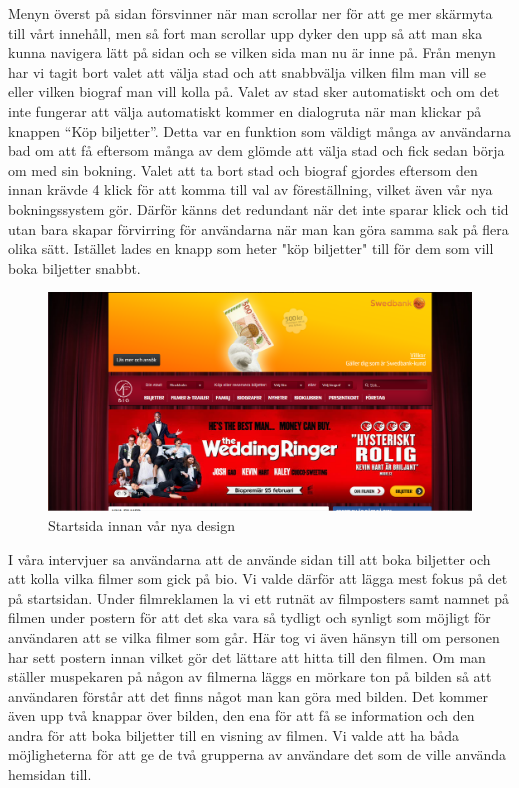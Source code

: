 \documentclass[swedish,a4paper,11pt]{article}
\begin{document}

Menyn överst på sidan försvinner när man scrollar ner för att ge mer skärmyta till vårt innehåll, men så fort man scrollar upp dyker den upp så att man ska kunna navigera lätt på sidan och se vilken sida man nu är inne på. Från menyn har vi tagit bort valet att välja stad och att snabbvälja vilken film man vill se eller vilken biograf man vill kolla på. Valet av stad sker automatiskt och om det inte fungerar att välja automatiskt kommer en dialogruta när man klickar på knappen “Köp biljetter”. Detta var en funktion som väldigt många av användarna bad om att få eftersom många av dem glömde att välja stad och fick sedan börja om med sin bokning. Valet att ta bort stad och biograf gjordes eftersom den innan krävde 4 klick för att komma till val av föreställning, vilket även vår nya bokningssystem gör. Därför känns det redundant när det inte sparar klick och tid utan bara skapar förvirring för användarna när man kan göra samma sak på flera olika sätt. Istället lades en knapp som heter "köp biljetter" till för dem som vill boka biljetter snabbt. 
\noindent

\begin{figure}[H]
\centering
\includegraphics[scale=0.27]{befintligstartsida.png} 
\caption{Startsida innan vår nya design}
\end{figure}





I våra intervjuer sa användarna att de använde sidan till att boka biljetter och att kolla vilka filmer som gick på bio. Vi valde därför att lägga mest fokus på det på startsidan. Under filmreklamen la vi ett rutnät av filmposters samt namnet på filmen under postern för att det ska vara så tydligt och synligt som möjligt för användaren att se vilka filmer som går. Här tog vi även hänsyn till om personen har sett postern innan vilket gör det lättare att hitta till den filmen. Om man ställer muspekaren på någon av filmerna läggs en mörkare ton på bilden så att användaren förstår att det finns något man kan göra med bilden. Det kommer även upp två knappar över bilden, den ena för att få se information och den andra för att boka biljetter till en visning av filmen. Vi valde att ha båda möjligheterna för att ge de två grupperna av användare det som de ville använda hemsidan till.
\\
\end{document}
